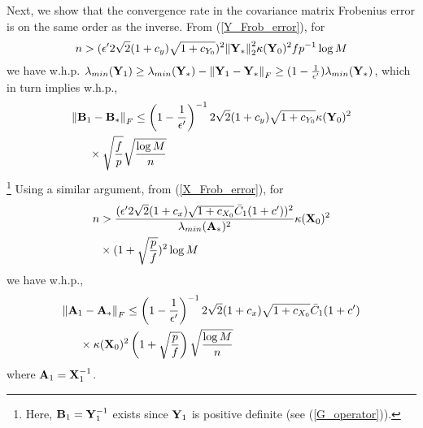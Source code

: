\begin{IEEEproof}
Next, we show that the convergence rate in the covariance matrix Frobenius error is on the same order as the inverse. From (\ref{Y_Frob_error}), for
\begin{equation*}
	n> (\epsilon' 2\sqrt{2} (1+c_y)\sqrt{1+c_{Y_0}})^2 { \parallel }{\mathbf{Y}}_*{ \parallel }_2^2 \kappa({\mathbf{Y}}_0)^2 fp^{-1} \log M
\end{equation*}
we have w.h.p. $\lambda_{min}({\mathbf{Y}}_1) \geq \lambda_{min}({\mathbf{Y}}_*)-{ \parallel } {\mathbf{Y}}_1-{\mathbf{Y}}_* { \parallel }_F\geq (1-\frac{1}{\epsilon'}) \lambda_{min}({\mathbf{Y}}_*)$, which in turn implies w.h.p.,
\begin{align}
	{ \parallel } & {\mathbf{B}}_1-{\mathbf{B}}_* { \parallel }_F \leq \left(1-\frac{1}{\epsilon'}\right)^{-1} 2\sqrt{2} (1+c_y)\sqrt{1+c_{Y_0}} \kappa({\mathbf{Y}}_0)^2 \nonumber \\
		&\quad \times \sqrt{\frac{f}{p}} \sqrt{\frac{\log M}{n}} \label{B1_Frob_error}
\end{align}
\footnote{Here, ${\mathbf{B}}_1 = {\mathbf{Y}}_1^{-1}$ exists since ${\mathbf{Y}}_1$ is positive definite (see (\ref{G_operator})).}
Using a similar argument, from (\ref{X_Frob_error}), for 
\begin{align*}
	n &>\frac{(\epsilon' 2\sqrt{2}(1+c_x)\sqrt{1+c_{X_0}} \bar{C}_1(1+c'))^2}{\lambda_{min}({\mathbf{A}}_*)^2} \kappa({\mathbf{X}}_0)^2 \\
		&\times (1+\sqrt{\frac{p}{f}})^2 \log M
\end{align*}
we have w.h.p.,
\begin{align}
	{ \parallel } &{\mathbf{A}}_1-{\mathbf{A}}_* { \parallel }_F \leq \left(1-\frac{1}{\epsilon'}\right)^{-1} 2\sqrt{2}(1+c_x)\sqrt{1+c_{X_0}} \bar{C}_1(1+c') \nonumber \\
		&\quad \times \kappa({\mathbf{X}}_0)^2 \left(1+\sqrt{\frac{p}{f}}\right) \sqrt{\frac{\log M}{n}} \label{A1_Frob_error}
\end{align}
where ${\mathbf{A}}_1={\mathbf{X}}_1^{-1}$.


\end{IEEEproof}
